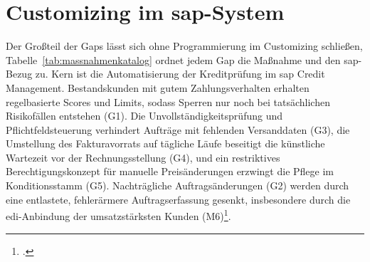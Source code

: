 \section{Customizing im \gls{sap}-System}\label{sec:customizing}

Der Großteil der Gaps lässt sich ohne Programmierung im Customizing schließen, Tabelle~\ref{tab:massnahmenkatalog} ordnet jedem Gap die Maßnahme und den \gls{sap}-Bezug zu. Kern ist die Automatisierung der Kreditprüfung im \gls{sap} Credit Management. Bestandskunden mit gutem Zahlungsverhalten erhalten regelbasierte Scores und Limits, sodass Sperren nur noch bei tatsächlichen Risikofällen entstehen (G1). Die Unvollständigkeitsprüfung und Pflichtfeldsteuerung verhindert Aufträge mit fehlenden Versanddaten (G3), die Umstellung des Fakturavorrats auf tägliche Läufe beseitigt die künstliche Wartezeit vor der Rechnungsstellung (G4), und ein restriktives Berechtigungskonzept für manuelle Preisänderungen erzwingt die Pflege im Konditionsstamm (G5). Nachträgliche Auftragsänderungen (G2) werden durch eine entlastete, fehlerärmere Auftragserfassung gesenkt, insbesondere durch die \gls{edi}-Anbindung der umsatzstärksten Kunden (M6)\footcite[Vgl.][S.~110 ff.]{nadukuru2024o2c}.

